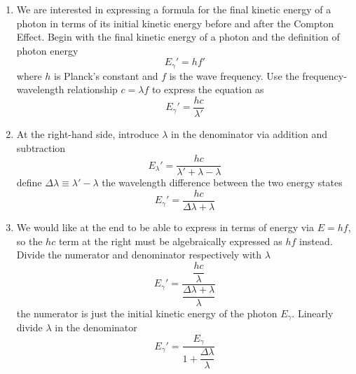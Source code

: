 \documentclass[12pt]{article}
\begin{document}
\begin{enumerate}

    

    \item We are interested in expressing a formula for the final kinetic energy
    of a photon in terms of its initial kinetic energy before and after the Compton Effect.
    Begin with the final kinetic energy of a photon and the definition of photon
    energy
    $$E_\gamma'=hf'$$
    where $h$ is Planck's constant and $f$ is the wave frequency.
    Use the frequency-wavelength relationship $c=\lambda f$ to express
    the equation as
    $$E_\gamma'=\frac{hc}{\lambda'}$$
    
    \item At the right-hand side, introduce $\lambda$ in the denominator via
    addition and subtraction
    $$E_\lambda'=\frac{hc}{\lambda'+\lambda-\lambda}$$
    define $\Delta\lambda\equiv\lambda'-\lambda$ the wavelength difference
    between the two energy states
    $$E_\gamma'=\frac{hc}{\Delta\lambda+\lambda}$$

    \item We would like at the end to be able to express in terms of energy
    via $E=hf$, so the $hc$ term at the right must be algebraically expressed
    as $hf$ instead. Divide the numerator and denominator respectively
    with $\lambda$
    $$E_\gamma'=\dfrac{\dfrac{hc}{\lambda}}{\dfrac{\Delta\lambda+\lambda}{\lambda}}$$
    the numerator is just the initial kinetic energy of the photon $E_\gamma$.
    Linearly divide $\lambda$ in the denominator
    $$E_\gamma'=\dfrac{E_\gamma}{1+\dfrac{\Delta\lambda}{\lambda}}$$


\end{enumerate}
\end{document}
